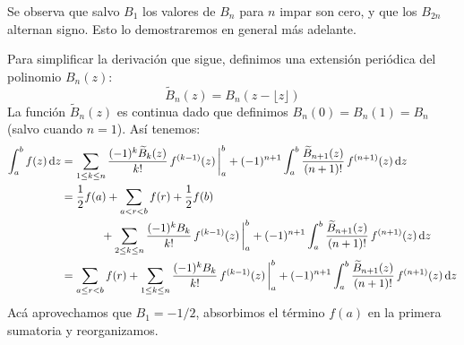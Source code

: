   Se observa que salvo \(B_1\)
  los valores de \(B_n\) para \(n\) impar
  son cero,
  y que los \(B_{2 n}\) alternan signo.
  Esto lo demostraremos en general más adelante.

  Para simplificar la derivación que sigue,
  definimos una extensión periódica del polinomio \(B_n(z)\):
  \begin{equation*}
    \widetilde{B}_n(z)
      = B_n(z - \lfloor z \rfloor)
  \end{equation*}
  La función \(\widetilde{B}_n(z)\) es continua
  dado que definimos \(B_n(0) = B_n(1) = B_n\)
  (salvo cuando \(n = 1\)).
  Así tenemos:
  \begin{align}
    \int_a^b f(z) \, \mathrm{d} z
      &= \sum_{1 \le k \le n}
	   \frac{(-1)^k \widetilde{B}_k(z)}{k!} \, f^{(k - 1)}(z)
	     \, \biggr|_a^b
	  + (-1)^{n + 1}
	      \int_a^b \frac{\widetilde{B}_{n + 1}(z)}{(n + 1)!} \,
				    f^{(n + 1)}(z)
		\, \mathrm{d} z \notag \\
      &= \frac{1}{2} f(a)
	   + \sum_{a < r < b} f(r)
	   + \frac{1}{2} f(b) \notag \\
      &\hspace{3.5em}
	    + \sum_{2 \le k \le n}
		\frac{(-1)^k B_k}{k!} \, f^{(k - 1)}(z)
		  \, \biggr|_a^b
	    + (-1)^{n + 1} \int_a^b
			     \frac{\widetilde{B}_{n + 1}(z)}
				  {(n + 1)!} \,
			     f^{(n + 1)}(z) \, \mathrm{d} z
	    \notag \\
      &= \sum_{a \le r < b} f(r)
	   + \sum_{1 \le k \le n}
	      \frac{(-1)^k B_k}{k!} \, f^{(k - 1)}(z)
		 \, \biggr|_a^b
	 + (-1)^{n + 1}
	     \int_a^b \frac{\widetilde{B}_{n + 1}(z)}{(n + 1)!} \,
				   f^{(n + 1)}(z)
	       \, \mathrm{d} z
	   \label{eq:Euler-Maclaurin-2}
  \end{align}
  Acá aprovechamos que \(B_1 = - 1 / 2\),
  absorbimos el término \(f(a)\)
  en la primera sumatoria y reorganizamos.

